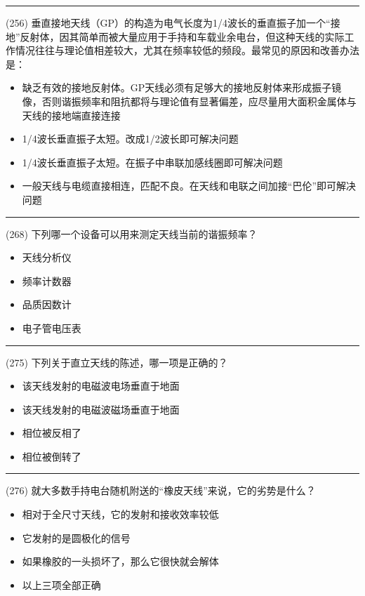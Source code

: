 \documentclass[twocolumn,hyperref,UTF8]{ctexart}  %
\begin{document}
\noindent\rule{0.5\textwidth}{1pt}
\heiti (256) 垂直接地天线（GP）的构造为电气长度为1/4波长的垂直振子加一个“接地”反射体，因其简单而被大量应用于手持和车载业余电台，但这种天线的实际工作情况往往与理论值相差较大，尤其在频率较低的频段。最常见的原因和改善办法是： \songti {\color{gray} [LK0925] }
\begin{itemize}
	\item  缺乏有效的接地反射体。GP天线必须有足够大的接地反射体来形成振子镜像，否则谐振频率和阻抗都将与理论值有显著偏差，应尽量用大面积金属体与天线的接地端直接连接
	\item  1/4波长垂直振子太短。改成1/2波长即可解决问题
	\item  1/4波长垂直振子太短。在振子中串联加感线圈即可解决问题
	\item  一般天线与电缆直接相连，匹配不良。在天线和电联之间加接“巴伦”即可解决问题
\end{itemize}


\noindent\rule{0.5\textwidth}{1pt}
\heiti (268) 下列哪一个设备可以用来测定天线当前的谐振频率？ \songti {\color{gray} [LK1184] }
\begin{itemize}
	\item  天线分析仪
	\item  频率计数器
	\item  品质因数计
	\item  电子管电压表
\end{itemize}


\noindent\rule{0.5\textwidth}{1pt}
\heiti (275) 下列关于直立天线的陈述，哪一项是正确的？ \songti {\color{gray} [LK1211] }
\begin{itemize}
	\item  该天线发射的电磁波电场垂直于地面
	\item  该天线发射的电磁波磁场垂直于地面
	\item  相位被反相了
	\item  相位被倒转了
\end{itemize}


\noindent\rule{0.5\textwidth}{1pt}
\heiti (276) 就大多数手持电台随机附送的“橡皮天线”来说，它的劣势是什么？ \songti {\color{gray} [LK1213] }
\begin{itemize}
	\item  相对于全尺寸天线，它的发射和接收效率较低
	\item  它发射的是圆极化的信号
	\item  如果橡胶的一头损坏了，那么它很快就会解体
	\item  以上三项全部正确
\end{itemize}
\end{document}
